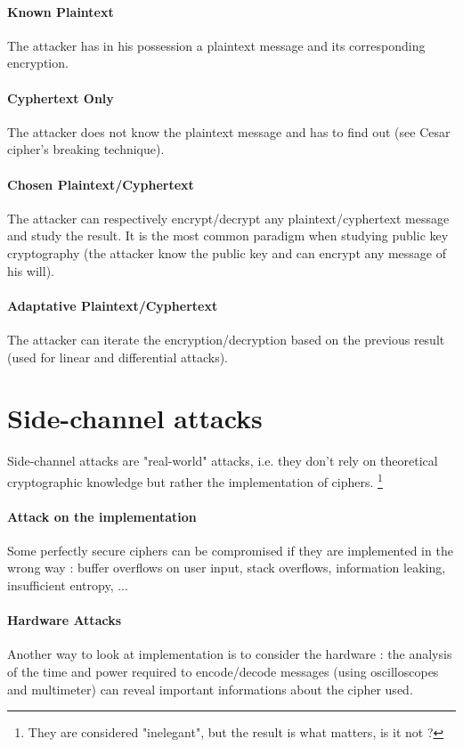 \paragraph{Known Plaintext} The attacker has in his possession a plaintext message and its corresponding encryption.

\paragraph{Cyphertext Only} The attacker does not know the plaintext message and has to find out (see Cesar cipher's breaking technique).

\paragraph{Chosen Plaintext/Cyphertext \\} 
The attacker can respectively encrypt/decrypt any plaintext/cyphertext message and study the result. It is the most common paradigm when studying public key cryptography (the attacker know the public key and can encrypt any message of his will).

\paragraph{Adaptative Plaintext/Cyphertext \\} 
The attacker can iterate the encryption/decryption based on the previous result (used for linear and differential attacks).

\section{Side-channel attacks}
Side-channel attacks are "real-world" attacks, i.e. they don't rely on theoretical cryptographic knowledge but rather the implementation of ciphers. \footnote{ They are considered "inelegant", but the result is what matters, is it not ?}

\paragraph{Attack on the implementation \\}
Some perfectly secure ciphers can be compromised if they are implemented in the wrong way : buffer overflows on user input, stack overflows, information leaking, insufficient entropy, ...   

\paragraph{Hardware Attacks \\}
Another way to look at implementation is to consider the hardware : the analysis of the time and power required to encode/decode messages (using oscilloscopes and multimeter) can reveal important informations about the cipher used.

